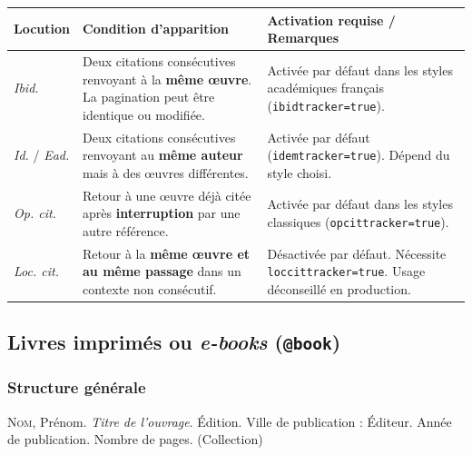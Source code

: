 \documentclass{article}
\begin{document}
\begin{center}
	\renewcommand{\arraystretch}{1.3}
	\begin{tabular}{|p{3cm}|p{6.5cm}|p{4.5cm}|}
		\hline
		\textbf{Locution}                              &
		\textbf{Condition d'apparition}                &
		\textbf{Activation requise / Remarques}          \\
		\hline

		\emph{Ibid.}                                   &
		Deux citations consécutives renvoyant à la \textbf{même œuvre}.
		La pagination peut être identique ou modifiée. &
		Activée par défaut dans les styles académiques français
		(\texttt{ibidtracker=true}).                     \\
		\hline

		\emph{Id.} / \emph{Ead.}                       &
		Deux citations consécutives renvoyant au \textbf{même auteur}
		mais à des œuvres différentes.                 &
		Activée par défaut (\texttt{idemtracker=true}).
		Dépend du style choisi.                          \\
		\hline

		\emph{Op. cit.}                                &
		Retour à une œuvre déjà citée après \textbf{interruption}
		par une autre référence.                       &
		Activée par défaut dans les styles classiques
		(\texttt{opcittracker=true}).                    \\
		\hline

		\emph{Loc. cit.}                               &
		Retour à la \textbf{même œuvre et au même passage}
		dans un contexte non consécutif.               &
		Désactivée par défaut.
		Nécessite \texttt{loccittracker=true}.
		Usage déconseillé en production.                 \\
		\hline
	\end{tabular}
\end{center}



\subsection{Livres imprimés ou \textit{e-books} (\texttt{@book})}

\subsubsection{Structure générale}

\textsc{Nom}, Prénom. \textit{Titre de l'ouvrage}. Édition. Ville de publication : Éditeur. Année de publication. Nombre de pages. (Collection)
\end{document}
